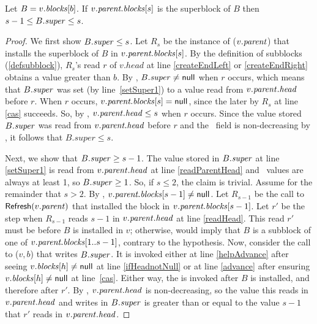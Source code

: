 \begin{lemma}\label{superRelation}
Let $B=v.\mbox{\textnormal{\textit{blocks}}}[b]$.
  If $v.\mbox{\textit{parent.blocks}}[s]$ is the superblock of $B$ then $s-1\leq B.\mbox{\textit{super}}\leq s$.
\end{lemma}
\begin{proof}
We first show $B.\mbox{\textit{super}}\leq s$.
Let $R_s$ be the instance of ($v.\mbox{\textit{parent}}$) that installs the superblock of $B$ 
in $v.\mbox{\textit{parent.blocks}}[s]$.
By the definition of subblocks (\ref{defsubblock}), $R_s$'s read $r$ of $v.head$ at line \ref{createEndLeft} or \ref{createEndRight} obtains a value greater than $b$.
By , $B.\mbox{\textit{super}} \neq \mbox{\sf null}$ when $r$ occurs, which means
that $B.\mbox{\textit{super}}$ was set (by line~\ref{setSuper1}) to a value read from $v.\mbox{\textit{parent}}.\mbox{\textit{head}}$ before $r$.
When $r$ occurs, $v.\mbox{\textit{parent.blocks}}[s] = \mbox{\sf null}$, since the later  by $R_s$ at line
\ref{cas} succeeds.
So, by , $v.\mbox{\textit{parent}}.\mbox{\textit{head}} \leq s$ when $r$ occurs.
Since the value stored $B.\mbox{\textit{super}}$ was read from $v.\mbox{\textit{parent.head}}$ before $r$ and the \head\ field is non-decreasing by , it follows that $B.super\leq s$.

Next, we show that $B.\mbox{\textit{super}}\geq s-1$.
The value stored in $B.\mbox{\textit{super}}$ at line \ref{setSuper1} is read from $v.\mbox{\textit{parent}}.\mbox{\textit{head}}$ at line \ref{readParentHead} and \head\ values are always at least 1, so $B.\mbox{\textit{super}} \geq 1$.
So, if $s\leq 2$, the claim is trivial.  Assume for the remainder that $s>2$.
By , $v.\mbox{\textit{parent.blocks}}[s-1]\neq \mbox{\sf null}$.  Let $R_{s-1}$ be the call to
${\sf Refresh}(v.\mbox{\textit{parent}})$ that installed the block in $v.\mbox{\textit{parent.blocks}}[s-1]$.
Let $r'$ be the step when $R_{s-1}$ reads $s-1$ in $v.\mbox{\textit{parent}}.\mbox{\textit{head}}$ at line \ref{readHead}.
This read $r'$ must be before $B$ is installed in $v$;
otherwise,  would imply that $B$ is a subblock of one of 
$v.\mbox{\textit{parent.blocks}}[1..s-1]$, contrary to the hypothesis.
Now, consider the call to ($v, b$) that writes $B.\mbox{\textit{super}}$.
It is invoked either 
at line \ref{helpAdvance} after seeing $v.\mbox{\textit{blocks}}[h]\neq \mbox{\sf null}$ at line \ref{ifHeadnotNull}
or at line \ref{advance} after ensuring $v.\mbox{\textit{blocks}}[h]\neq \mbox{\sf null}$ at line~\ref{cas}.
Either way, the  is invoked after $B$ is installed, and therefore after $r'$.
By , $v.\mbox{\textit{parent}}.\mbox{\textit{head}}$ is non-decreasing, so 
the value this  reads in $v.\mbox{\textit{parent}}.\mbox{\textit{head}}$ and
writes in $B.\mbox{\textit{super}}$ is greater than or equal to the value $s-1$ that $r'$ reads in $v.\mbox{\textit{parent}}.\mbox{\textit{head}}$.
\end{proof}

